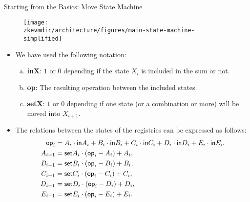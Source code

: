 
\begin{frame}[allowframebreaks]{Starting from the Basics: Move State Machine}
\vspace{-0.3cm}
\begin{figure}
	\texttt{[image: \\zkevmdir/architecture/figures/main-state-machine-simplified]}
\end{figure}

\begin{itemize}
\item We have used the following notation:
\begin{enumerate}[a)]
\item \textbf{inX}: $1$ or $0$ depending if the state $X_i$ is included in the sum or not.

\item \textbf{op}: The resulting operation between the included states.

\item \textbf{setX}: $1$ or $0$ depending if one state (or a combination or more) will be moved into $X_{i+1}$.
\end{enumerate}
 
\item The relations between the states of the registries can be expressed as follows:
\begin{align*}
\mathsf{op}_i &= A_i \cdot \mathsf{in} A_i + B_i \cdot \mathsf{in} B_i + C_i \cdot \mathsf{in} C_i + D_i \cdot \mathsf{in} D_i + E_i \cdot \mathsf{in} E_i, \\
A_{i+1} &= \mathsf{set} A_i \cdot (\mathsf{op}_i - A_i) + A_i, \\
B_{i+1} &= \mathsf{set} B_i \cdot (\mathsf{op}_i - B_i) + B_i, \\
C_{i+1} &= \mathsf{set} C_i \cdot (\mathsf{op}_i - C_i) + C_i, \\
D_{i+1} &= \mathsf{set} D_i \cdot (\mathsf{op}_i - D_i) + D_i, \\
E_{i+1} &= \mathsf{set} E_i \cdot (\mathsf{op}_i - E_i) + E_i.
\end{align*}
\end{itemize}
\end{frame}











